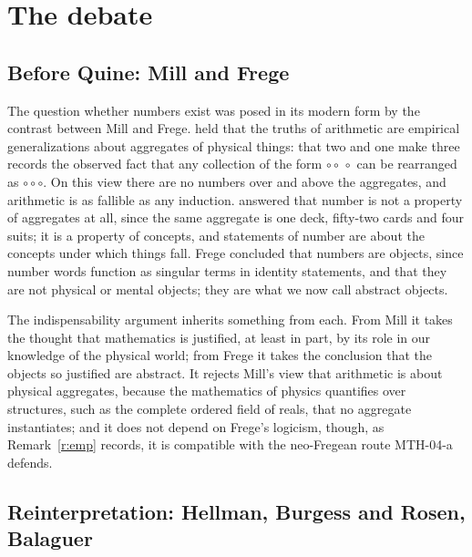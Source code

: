 \documentclass{situationist-preprint}
\begin{document}
\section{The debate}\label{s:history}

\subsection{Before Quine: Mill and Frege}

The question whether numbers exist was posed in its modern form by the contrast between Mill and Frege. \citet[book~II, ch.~6]{Mill1843} held that the truths of arithmetic are empirical generalizations about aggregates of physical things: that two and one make three records the observed fact that any collection of the form ${\circ}{\circ}\,{\circ}$ can be rearranged as ${\circ}{\circ}{\circ}$. On this view there are no numbers over and above the aggregates, and arithmetic is as fallible as any induction. \citet{Frege1884} answered that number is not a property of aggregates at all, since the same aggregate is one deck, fifty-two cards and four suits; it is a property of concepts, and statements of number are about the concepts under which things fall. Frege concluded that numbers are objects, since number words function as singular terms in identity statements, and that they are not physical or mental objects; they are what we now call abstract objects.

The indispensability argument inherits something from each. From Mill it takes the thought that mathematics is justified, at least in part, by its role in our knowledge of the physical world; from Frege it takes the conclusion that the objects so justified are abstract. It rejects Mill's view that arithmetic is about physical aggregates, because the mathematics of physics quantifies over structures, such as the complete ordered field of reals, that no aggregate instantiates; and it does not depend on Frege's logicism, though, as Remark~\ref{r:emp} records, it is compatible with the neo-Fregean route MTH-04-a defends.

\subsection{Reinterpretation: Hellman, Burgess and Rosen, Balaguer}
\end{document}
